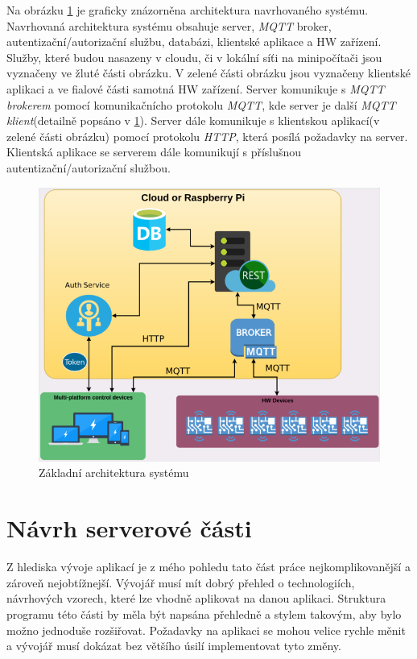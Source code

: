 Na obrázku \ref{figure:architektura} je graficky znázorněna architektura navrhovaného systému.
Navrhovaná architektura systému obsahuje server, \emph{MQTT} broker, autentizační/autorizační službu, databázi, klientské aplikace a HW zařízení.
Služby, které budou nasazeny v cloudu, či v lokální síťi na minipočítači jsou vyznačeny ve žluté části obrázku.
V zelené části obrázku jsou vyznačeny klientské aplikaci a ve fialové části samotná HW zařízení.
Server komunikuje s \emph{MQTT brokerem} pomocí komunikačnícho protokolu \emph{MQTT}, kde server je další \emph{MQTT klient}(detailně popsáno v \ref{navrh:backend}).
Server dále komunikuje s klientskou aplikací(v zelené části obrázku) pomocí protokolu \emph{HTTP}, která posílá požadavky na server.
Klientská aplikace se serverem dále komunikují s příslušnou autentizační/autorizační službou.

\begin{figure}[hbt]
  \centering
  \includegraphics[width=0.8 \linewidth]{obrazky-figures/navrh.png}
  \caption{Základní architektura systému}
  \label{figure:architektura}
\end{figure}

\section{Návrh serverové části}
\label{navrh:backend}
Z hlediska vývoje aplikací je z mého pohledu tato část práce nejkomplikovanější a zároveň nejobtížnejší.
Vývojář musí mít dobrý přehled o technologiích, návrhových vzorech, které lze vhodně aplikovat na danou aplikaci.
Struktura programu této části by měla být napsána přehledně a stylem takovým, aby bylo možno jednoduše rozšiřovat.
Požadavky na aplikaci se mohou velice rychle měnit a vývojář musí dokázat bez většího úsilí implementovat tyto změny.

